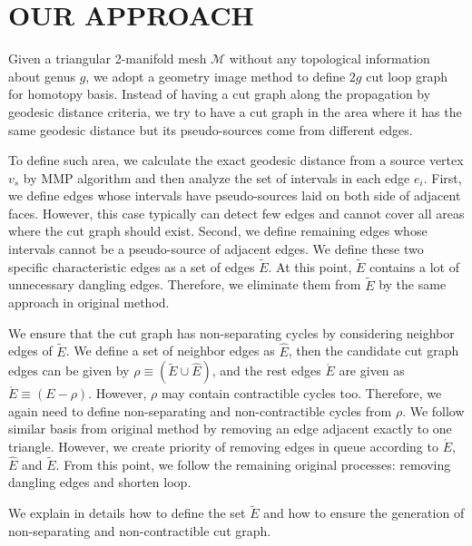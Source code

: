 \documentclass[a4paper,twoside]{article}
\begin{document}
\section{\uppercase{Our Approach}}
\label{sec:our approach}
\noindent Given a triangular 2-manifold mesh $\mathscr{M}$ without any topological information about genus $g$, we adopt a geometry image method \cite{Gu:2002:GI:566654.566589} to define $2g$ cut loop graph for homotopy basis. Instead of having a cut graph along the propagation by geodesic distance criteria, we try to have a cut graph in the area where it has the same geodesic distance but its pseudo-sources come from different edges.

To define such area, we calculate the exact geodesic distance from a source vertex $v_{s}$ by MMP algorithm \cite{Mitchell:1987:DGP:33367.33372} and then  analyze the set of intervals in each edge $e_i$. First, we define edges whose intervals have pseudo-sources laid on both side of adjacent faces. However, this case typically can detect few edges and cannot cover all areas where the cut graph should exist. Second, we define remaining edges whose intervals cannot be a pseudo-source of adjacent edges. We define these two specific characteristic edges as a set of edges $\tilde{E}$. At this point, $\tilde{E}$ contains a lot of unnecessary dangling edges. Therefore, we eliminate them from $\tilde{E}$ by the same approach in original method.

We ensure that the cut graph has non-separating cycles by considering neighbor edges of $\tilde{E}$. We define a set of neighbor edges as $\hat{E}$, 
then the candidate cut graph edges can be given by $\rho \equiv (\tilde{E} \cup \hat{E})$, and the rest edges $\acute{E}$ are given as $\acute{E} \equiv (E - \rho)$. However, $\rho$ may contain contractible cycles too. Therefore, we again need to define non-separating and non-contractible cycles from $\rho$. We follow similar basis from original method by removing an edge adjacent exactly to one triangle. However, we create priority of removing edges in queue according to $\acute{E}$,  $\hat{E}$ and $\tilde{E}$. From this point, we follow the remaining original processes: removing dangling edges and shorten loop.

We explain in details how to define the set $\tilde{E}$ and how to ensure the generation of non-separating and non-contractible cut graph.
\end{document}
